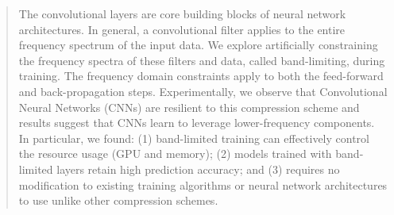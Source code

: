 \begin{abstract}
  The convolutional layers are core building blocks of neural network architectures. In general, a convolutional filter applies to the entire frequency spectrum of the input data. We explore artificially constraining the frequency spectra of these filters and data, called band-limiting, during training. 
  The frequency domain constraints apply to both the feed-forward and back-propagation steps. Experimentally, we observe that Convolutional Neural Networks (CNNs) are resilient to this compression scheme and results suggest that CNNs learn to leverage lower-frequency components. In particular, we found: (1) band-limited training can effectively control the resource usage (GPU and memory); (2) models trained with band-limited layers retain high prediction accuracy; and (3) requires no modification to existing training algorithms or neural network architectures to use unlike other compression schemes. 
\end{abstract}